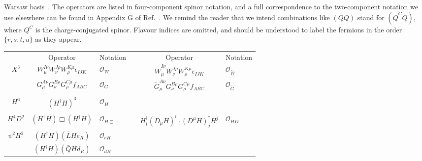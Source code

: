 \begin{table}
\begin{center}
{      Warsaw basis~\cite{Buchmuller:1985jz, Grzadkowski:2010es}. The operators
      are listed in four-component spinor notation, and a full correspondence to
      the two-component notation we use elsewhere can be found in Appendix G of
      Ref.~\cite{Dreiner:2008tw}. We remind the reader that we intend
      combinations like $(Q Q)$ stand for $(\bar{Q}^{C} Q)$, where $Q^{C}$ is
      the charge-conjugated spinor. Flavour indices are omitted, and should be
      understood to label the fermions in the order $\{r, s, t, u\}$ as they
      appear. \label{tab:ch1-smeft-d6-psi4}}
  \end{center}
\end{table}

\begin{table}
  \begin{center}
    \begin{tabular}{cclccl}
      \toprule
      & Operator & Notation & & Operator & Notation \\
      \cmidrule{2-3} \cmidrule{5-6}
      \multirow{2}{*}{$X^3$}
      &
      $W^{I\nu }_{\mu} W^{J\rho}_{\nu} W^{K \mu}_{\rho} \epsilon_{IJK} $ &
      $\mathcal{O}_{W}$ &
      &
      $\tilde{W}^{I \nu}_{\mu} W^{J\rho}_{\nu} W^{K\mu}_{\rho} \epsilon_{IJK}$ &
      $\mathcal{O}_{\tilde{W}}$ \\
      &
      $G^{A\nu}_\mu G^{B\rho}_\nu G^{C\mu}_\rho f_{ABC}$ &
      $\mathcal{O}_{G}$ &
      &
      $\tilde{G}^{A\nu}_\mu G^{B\rho}_\nu G^{C\mu}_\rho f_{ABC}$ &
      $\mathcal{O}_{\tilde{G}}$ \\[1mm]
      \midrule[0.25mm]
      \vspace{-5mm} & & & & \\
      $H^6$ &
      $(H^{\dagger} H)^3$ &
      $\mathcal{O}_{H}$ &
      & & \\[1mm]
      \midrule[0.25mm]
      \vspace{-5mm} & & & & \\
      $H^4 D^2$ &
      $(H^{\dagger} H )\Box (H^{\dagger} H)$ &
      $\mathcal{O}_{H \Box}$ &
      &
      $H^{\dagger}_{i} (D_\mu H)^{i} \cdot (D^\mu H)_{j}^{\dagger} H^{j}$ &
      $\mathcal{O}_{H D}$ \\[1mm]
      \midrule[0.25mm]
      \multirow{2}{*}{$\psi^2 H^2$} &
      $(H^{\dagger} H) (\bar{L} H e_R)$ &
      $\mathcal{O}_{e H}$ & & \\
      &
      $(H^{\dagger} H)
      (\bar{Q} H d_R)$ &
      $\mathcal{O}_{d H}$ &

\end{tabular}
\end{center}
\end{table}
